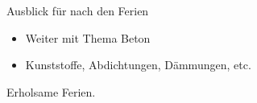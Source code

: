\begin{frame}{Ausblick für nach den Ferien}
    \begin{itemize}
        \item[\textbullet] Weiter mit Thema Beton 
        \item[\textbullet] Kunststoffe, Abdichtungen, Dämmungen, etc. 
    \end{itemize}

\end{frame}




\begin{frame}{Erholsame Ferien.}

\end{frame}


